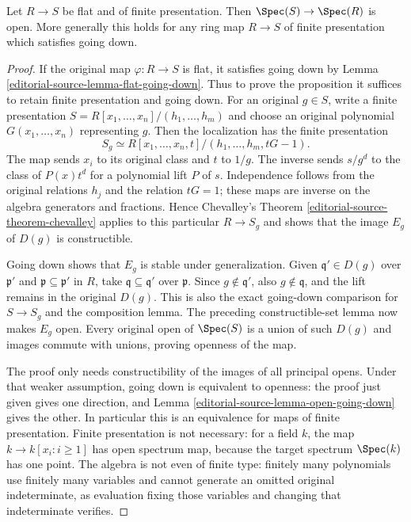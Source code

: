 \begin{proposition}
\label{editorial-source-proposition-fppf-open}
Let $R \to S$ be flat and of finite presentation.
Then $\Spec(S) \to \Spec(R)$ is open.
More generally this holds for any ring map $R \to S$ of
finite presentation which satisfies going down.
\end{proposition}

\begin{proof}
If the original map $\varphi:R\to S$ is flat, it
satisfies going down by Lemma \ref{editorial-source-lemma-flat-going-down}.
Thus to prove the proposition it suffices to retain
finite presentation and going down.
For an original $g\in S$, write a finite presentation
$S=R[x_1,\ldots,x_n]/(h_1,\ldots,h_m)$ and choose
an original polynomial $G(x_1,\ldots,x_n)$ representing
$g$. Then the localization has the finite presentation
$$
S_g\simeq
R[x_1,\ldots,x_n,t]/(h_1,\ldots,h_m,tG-1).
$$
The map sends $x_i$ to its original class and $t$
to $1/g$. The inverse sends $s/g^d$ to the class
of $P(x)t^d$ for a polynomial lift $P$ of $s$.
Independence follows from the original relations
$h_j$ and the relation $tG=1$; these maps are
inverse on the algebra generators and fractions.
Hence Chevalley's Theorem \ref{editorial-source-theorem-chevalley}
applies to this particular $R\to S_g$ and shows
that the image $E_g$ of $D(g)$ is constructible.

Going down shows that $E_g$ is stable under
generalization. Given $\mathfrak q'\in D(g)$ over
$\mathfrak p'$ and $\mathfrak p\subseteq\mathfrak p'$
in $R$, take $\mathfrak q\subseteq\mathfrak q'$
over $\mathfrak p$. Since $g\notin\mathfrak q'$,
also $g\notin\mathfrak q$, and the lift remains
in the original $D(g)$. This is also the exact
going-down comparison for $S\to S_g$ and the
composition lemma. The preceding constructible-set
lemma now makes $E_g$ open. Every original open
of $\Spec(S)$ is a union of such $D(g)$ and images
commute with unions, proving openness of the map.

The proof only needs constructibility of the
images of all principal opens. Under that weaker
assumption, going down is equivalent to openness:
the proof just given gives one direction, and
Lemma \ref{editorial-source-lemma-open-going-down} gives the other.
In particular this is an equivalence for maps of
finite presentation. Finite presentation is not
necessary: for a field $k$, the map
$k\to k[x_i:i\geq1]$ has open spectrum map,
because the target spectrum $\Spec(k)$ has one
point. The algebra is not even of finite type:
finitely many polynomials use finitely many
variables and cannot generate an omitted original
indeterminate, as evaluation fixing those variables
and changing that indeterminate verifies.


\end{proof}

